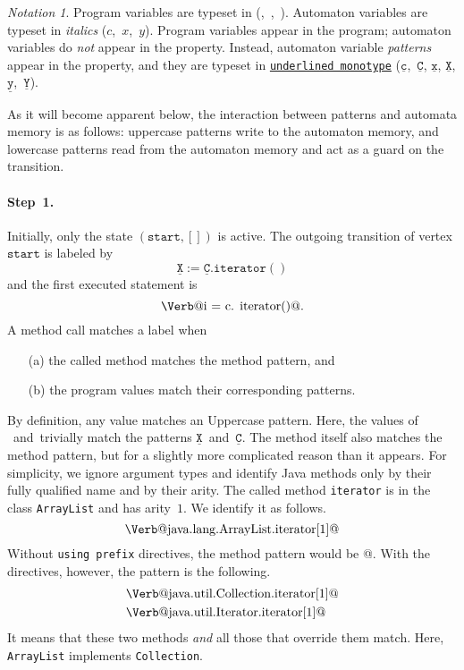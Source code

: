 \documentclass[preprint]{sigplanconf} %
\makeatletter
\newcommand{\pattern}[1]{\ensuremath{\mathtt{\underline{#1}}}}
\newcommand{\start}{\ensuremath{\mathtt{start}}\xspace}
\newcommand{\verbline}[2][]{\[\text{\Verb@#2@}#1\]}
\theoremstyle{definition}
\theoremstyle{remark}
\newtheorem{notation}{Notation}
\makeatother
\begin{document}
\begin{notation}
Program variables are typeset in \Verb@monotype@ (\Verb@c@,~\Verb@i@,~\Verb@j@).
Automaton variables are typeset in \textit{italics} ($c$,~$x$,~$y$).
Program variables appear in the program;
automaton variables do \emph{not} appear in the property.
Instead, automaton variable \emph{patterns} appear in the property, and they are typeset in \texttt{\underline{underlined monotype}} (\pattern c,~\pattern C, \pattern x, \pattern X, \pattern y,~\pattern Y).
\end{notation}

As it will become apparent below, the interaction between patterns and automata memory is as follows: uppercase patterns write to the automaton memory, and lowercase patterns read from the automaton memory and act as a guard on the transition.

\paragraph{Step~1.}

Initially, only the state $(\start,[])$ is active.
The outgoing transition of vertex \start is labeled by \[\pattern X:=\pattern{C}.\mathtt{iterator}()\] and the first executed statement is \verbline[.]{i = c.\PY{n+na}{iterator}()}
A method call matches a label when
\begin{itemize}
\item[(a)] the called method matches the method pattern, and
\item[(b)] the program values match their corresponding patterns.
\end{itemize}
By definition, any value matches an Uppercase pattern.
Here, the values of \Verb@i@~and~\Verb@c@ trivially match the patterns \pattern X~and~\pattern C.
The method itself also matches the method pattern, but for a slightly more complicated reason than it appears.
For simplicity, we ignore argument types and identify Java methods only by their fully qualified name and by their arity.
The called method \texttt{iterator} is in the class \texttt{ArrayList} and has arity~$1$.
We identify it as follows.
\verbline{java.lang.ArrayList.iterator[1]}
Without \texttt{using prefix} directives, the method pattern would be \Verb@iterator[1]@.
With the directives, however, the pattern is the following.
\begin{align*}
&\text{\Verb@java.util.Collection.iterator[1]@} \\
&\text{\Verb@java.util.Iterator.iterator[1]@}
\end{align*}
It means that these two methods \emph{and} all those that override them match.
Here, \texttt{ArrayList} implements \texttt{Collection}.
\end{document}
